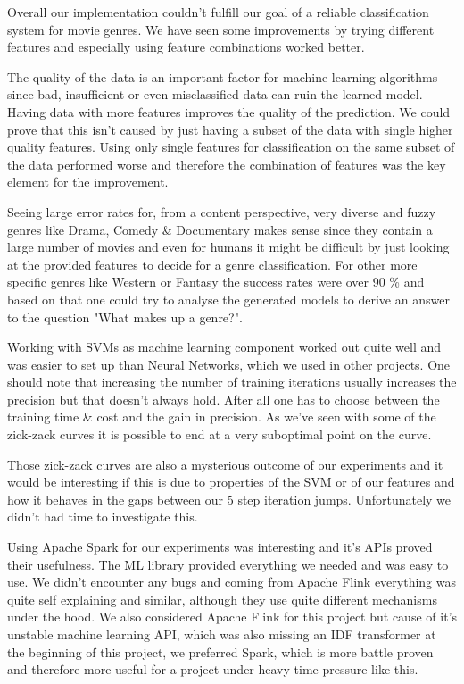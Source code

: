 \documentclass{vldb}
\begin{document}
\par Overall our implementation couldn't fulfill our goal of a reliable classification system for movie genres. We have seen some improvements by trying different features and especially using feature combinations worked better.
\par The quality of the data is an important factor for machine learning algorithms since bad, insufficient or even misclassified data can ruin the learned model. Having data with more features improves the quality of the prediction. We could prove that this isn't caused by just having a subset of the data with single higher quality features. Using only single features for classification on the same subset of the data performed worse and therefore the combination of features was the key element for the improvement.
\par Seeing large error rates for, from a content perspective, very diverse and fuzzy genres like Drama, Comedy \& Documentary makes sense since they contain a large number of movies and even for humans it might be difficult by just looking at the provided features to decide for a genre classification. For other more specific genres like Western or Fantasy the success rates were over 90 \% and based on that one could try to analyse the generated models to derive an answer to the question "What makes up a genre?".
\par Working with SVMs as machine learning component worked out quite well and was easier to set up than Neural Networks, which we used in other projects. One should note that increasing the number of training iterations usually increases the precision but that doesn't always hold. After all one has to choose between the training time \& cost and the gain in precision. As we've seen with some of the zick-zack curves it is possible to end at a very suboptimal point on the curve.
\par Those zick-zack curves are also a mysterious outcome of our experiments and it would be interesting if this is due to properties of the SVM or of our features and how it behaves in the gaps between our 5 step iteration jumps. Unfortunately we didn't had time to investigate this.
\par Using Apache Spark for our experiments was interesting and it's APIs proved their usefulness. The ML library provided everything we needed and was easy to use. We didn't encounter any bugs and coming from Apache Flink everything was quite self explaining and similar, although they use quite different mechanisms under the hood. We also considered Apache Flink for this project but cause of it's unstable machine learning API, which was also missing an IDF transformer at the beginning of this project, we preferred Spark, which is more battle proven and therefore more useful for a project under heavy time pressure like this.
\end{document}
